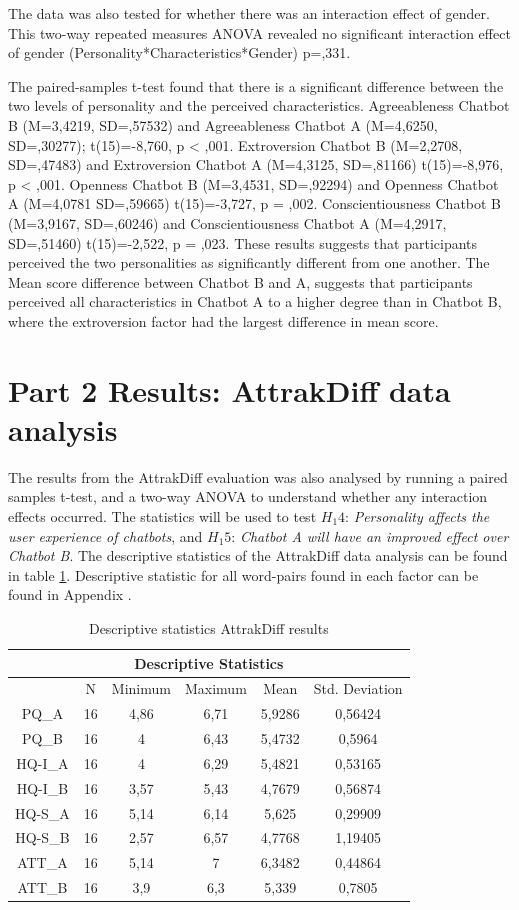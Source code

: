 The data was also tested for whether there was an interaction effect of gender. This two-way repeated measures ANOVA revealed no significant interaction effect of gender (Personality*Characteristics*Gender) p=,331.

The paired-samples t-test found that there is a significant difference between the two levels of personality and the perceived characteristics. Agreeableness Chatbot B (M=3,4219, SD=,57532) and Agreeableness Chatbot A (M=4,6250, SD=,30277); t(15)=-8,760, p < ,001. Extroversion Chatbot B (M=2,2708, SD=,47483) and Extroversion Chatbot A (M=4,3125, SD=,81166) t(15)=-8,976, p < ,001. Openness Chatbot B (M=3,4531, SD=,92294) and Openness Chatbot A (M=4,0781 SD=,59665) t(15)=-3,727, p = ,002. Conscientiousness Chatbot B (M=3,9167, SD=,60246) and Conscientiousness Chatbot A (M=4,2917, SD=,51460) t(15)=-2,522, p = ,023. These results suggests that participants perceived the two personalities as significantly different from one another. The Mean score difference between Chatbot B and A, suggests that participants perceived all characteristics in Chatbot A to a higher degree than in Chatbot B, where the extroversion factor had the largest difference in mean score.

\section{Part 2 Results: AttrakDiff data analysis }
        
The results from the AttrakDiff evaluation was also analysed by running a paired samples t-test, and a two-way ANOVA to understand whether any interaction effects occurred. The statistics will be used to test $H_1 4$: \textit{Personality affects the user experience of chatbots}, and $H_1 5$: \textit{Chatbot A will have an improved effect over Chatbot B}. The descriptive statistics of the AttrakDiff data analysis can be found in table \ref{table:6}. Descriptive statistic for all word-pairs found in each factor can be found in Appendix .

\begin{table}[h]
\centering
\begin{tabular}{cccccc}
\hline
\multicolumn{6}{c}{\textbf{Descriptive Statistics}} \\
\hline
& N & Minimum & Maximum & Mean & Std. Deviation \\
PQ_A & 16 & 4,86 & 6,71 & 5,9286 & 0,56424 \\
PQ_B & 16 & 4 & 6,43 & 5,4732 & 0,5964 \\
HQ-I_A & 16 & 4 & 6,29 & 5,4821 & 0,53165 \\
HQ-I_B & 16 & 3,57 & 5,43 & 4,7679 & 0,56874 \\
HQ-S_A & 16 & 5,14 & 6,14 & 5,625 & 0,29909 \\
HQ-S_B & 16 & 2,57 & 6,57 & 4,7768 & 1,19405 \\
ATT_A & 16 & 5,14 & 7 & 6,3482 & 0,44864 \\
ATT_B & 16 & 3,9 & 6,3 & 5,339 & 0,7805 \\
\end{tabular}
\caption{Descriptive statistics AttrakDiff results}
 \label{table:6}
    \end{table}

